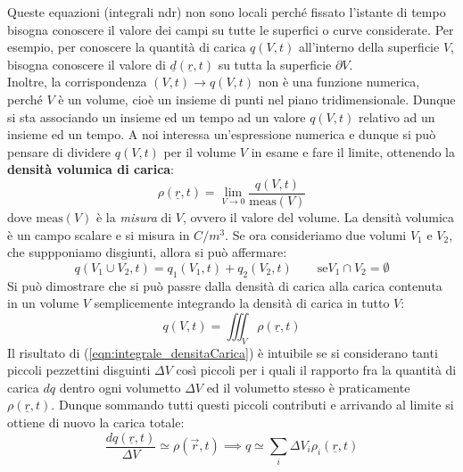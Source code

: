 \documentclass{book}
\begin{document}
        Queste equazioni (integrali ndr) non sono locali perché fissato l'istante di tempo bisogna conoscere il valore dei campi su tutte le superfici o curve considerate. Per esempio, per conoscere la quantità di carica $q(V,t)$ all'interno della superficie $V$, bisogna conoscere il valore di $\underline{d}(\underline{r},t)$ su tutta la superficie $\partial V$. \\
        Inoltre, la corrispondenza $(V,t) \to q(V,t)$ non è una funzione numerica, perché $V$ è un volume, cioè un insieme di punti nel piano tridimensionale. Dunque si sta associando un insieme ed un tempo ad un valore $q(V,t)$ relativo ad un insieme ed un tempo. A noi interessa un'espressione numerica e dunque si può pensare di dividere $q(V,t)$ per il volume $V$ in esame e fare il limite, ottenendo la \textbf{densità volumica di carica}:
        \begin{equation}
            \rho(\underline{r},t) = \lim_{V \to 0} \frac{q(V,t)}{\textrm{meas}(V)}
        \end{equation}
        dove $\textrm{meas}(V)$ è la \textit{misura} di $V$, ovvero il valore del volume. La densità volumica è un campo scalare e si misura in $C/m^{3}$. Se ora consideriamo due volumi $V_{1}$ e $V_{2}$, che suppponiamo disgiunti, allora si può affermare:
        \begin{equation}
            q(V_{1} \cup V_{2}, t) = q_{1}(V_{1},t) + q_{2}(V_{2},t) \quad \quad \textrm{se} V_{1} \cap V_{2} = \emptyset
        \end{equation}
        Si può dimostrare che si può passre dalla densità di carica alla carica contenuta in un volume $V$ semplicemente integrando la densità di carica in tutto $V$:
        \begin{equation}
           \label{eqn:integrale_densitaCarica}
            q(V,t) = \iiint_{V} \rho(\underline{r},t)
        \end{equation}
        Il risultato di (\ref{eqn:integrale_densitaCarica}) è intuibile se si considerano tanti piccoli pezzettini disguinti $\Delta V$ così piccoli per i quali il rapporto fra la quantità di carica $dq$ dentro ogni volumetto $\Delta V$ ed il volumetto stesso è praticamente $\rho(\underline{r}, t)$. Dunque sommando tutti questi piccoli contributi e arrivando al limite si ottiene di nuovo la carica totale:
        \begin{equation}
            \frac{dq(\underline{r},t)}{\Delta V} \simeq \rho(\vec{r},t) \implies q \simeq \sum_{i}\Delta V_{i}\rho_{i}(\underline{r},t)
        \end{equation}
\end{document}
